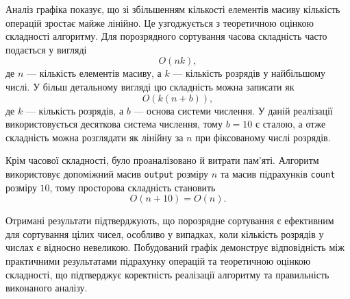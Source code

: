 \documentclass[12pt,a4paper]{article}
\begin{document}
    Аналіз графіка показує, що зі збільшенням кількості елементів масиву кількість операцій зростає майже лінійно. Це узгоджується з теоретичною оцінкою складності алгоритму. Для порозрядного сортування часова складність часто подається у вигляді
    \[
    O(nk),
    \]
    де $n$ --- кількість елементів масиву, а $k$ --- кількість розрядів у найбільшому числі. У більш детальному вигляді цю складність можна записати як
    \[
    O(k(n+b)),
    \]
    де $k$ --- кількість розрядів, а $b$ --- основа системи числення. У даній реалізації використовується десяткова система числення, тому $b=10$ є сталою, а отже складність можна розглядати як лінійну за $n$ при фіксованому числі розрядів.

    Крім часової складності, було проаналізовано й витрати пам'яті. Алгоритм використовує допоміжний масив \texttt{output} розміру $n$ та масив підрахунків \texttt{count} розміру $10$, тому просторова складність становить
    \[
    O(n + 10) = O(n).
    \]

    Отримані результати підтверджують, що порозрядне сортування є ефективним для сортування цілих чисел, особливо у випадках, коли кількість розрядів у числах є відносно невеликою. Побудований графік демонструє відповідність між практичними результатами підрахунку операцій та теоретичною оцінкою складності, що підтверджує коректність реалізації алгоритму та правильність виконаного аналізу.
\end{document}
